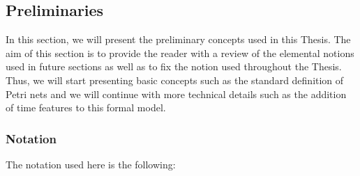 \subsection*{Preliminaries}
In this section, we will present the preliminary concepts
used in this Thesis. The aim of this section is to provide the reader
with a review of the elemental notions used in future sections
as well as to fix the notion used throughout the Thesis.
Thus, we will start presenting basic concepts such as the standard definition of Petri
nets and we will continue with more technical details such as the addition of time features
to this formal model.


\subsubsection{Notation}
The notation used here is the following:

